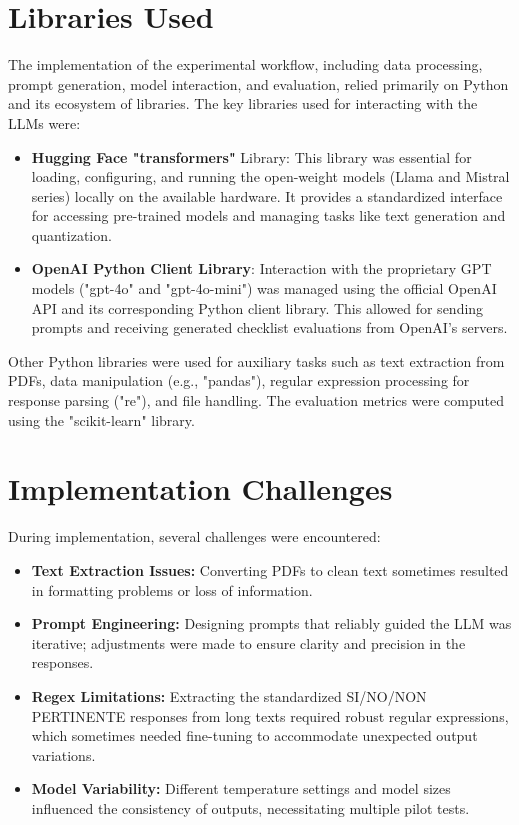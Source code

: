 \documentclass[../main.tex]{subfiles}
\begin{document}
\section{Libraries Used}
\label{subsec:libraries}
The implementation of the experimental workflow, including data processing, prompt generation, model interaction, and evaluation, relied primarily on Python and its ecosystem of libraries. The key libraries used for interacting with the LLMs were:

\begin{itemize}
    \item \textbf{Hugging Face "transformers"} Library: This library was essential for loading, configuring, and running the open-weight models (Llama and Mistral series) locally on the available hardware. It provides a standardized interface for accessing pre-trained models and managing tasks like text generation and quantization.
    \item \textbf{OpenAI Python Client Library}: Interaction with the proprietary GPT models ("gpt-4o" and "gpt-4o-mini") was managed using the official OpenAI API and its corresponding Python client library. This allowed for sending prompts and receiving generated checklist evaluations from OpenAI's servers.
\end{itemize}

Other Python libraries were used for auxiliary tasks such as text extraction from PDFs, data manipulation (e.g., "pandas"), regular expression processing for response parsing ("re"), and file handling. The evaluation metrics were computed using the "scikit-learn" library.


\section{Implementation Challenges}
During implementation, several challenges were encountered:

\begin{itemize}
    \item \textbf{Text Extraction Issues:}
 Converting PDFs to clean text sometimes resulted in formatting problems or loss of information.
    \item \textbf{Prompt Engineering:}
 Designing prompts that reliably guided the LLM was iterative; adjustments were made to ensure clarity and precision in the responses.\cite{vatsalSurveyPromptEngineering2024}
    \item \textbf{Regex Limitations:}
 Extracting the standardized SI/NO/NON PERTINENTE responses from long texts required robust regular expressions, which sometimes needed fine-tuning to accommodate unexpected output variations.
    \item \textbf{Model Variability:}
 Different temperature settings and model sizes influenced the consistency of outputs, necessitating multiple pilot tests.
\end{itemize}
 
\end{document}
